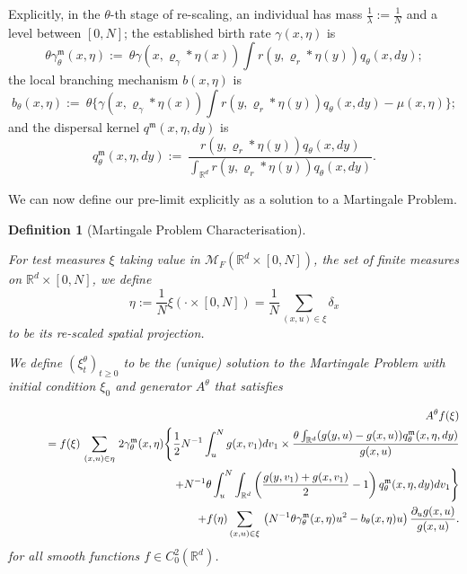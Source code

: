 \documentclass[12pt]{article}
\newtheorem{definition}[theorem]{Definition}
\def \non{{\nonumber}}
\begin{document}
Explicitly, in the $\theta$-th stage of re-scaling,
an individual has mass $\frac{1}{\lambda} := \frac{1}{N}$
and a level between $[0,N]$;
the established birth rate $\gamma(x,\eta)$ is
$$\theta\gamma^{\mathfrak{m}}_{\theta}(x, \eta)
:=~\theta\gamma(x, \varrho_{\gamma}*\eta(x)) \int r(y, \varrho_{r}*\eta(y))q_{\theta}(x,dy);$$
the local branching mechanism $b(x,\eta)$ is 
$$b_{\theta}(x, \eta):=~ \theta \bigg\{ \gamma(x, \varrho_{\gamma}*\eta(x)) \int r(y, \varrho_{r}*\eta(y))q_{\theta}(x,dy)-\mu(x, \eta)\bigg\};$$
and the dispersal kernel $q^{\mathfrak{m}}(x,\eta, dy)$ is 
$$q^{\mathfrak{m}}_{\theta}(x,\eta,dy) 
:=~ \frac{r(y,\varrho_{r}*\eta(y)) q_{\theta}(x,dy)}{\int_{\mathbb{R}^d} r(y,\varrho_{r}*\eta(y)) q_{\theta}(x,dy)}.$$

We can now define our pre-limit explicitly as a solution to a Martingale Problem.
\begin{definition}[Martingale Problem Characterisation]
\label{Def: Rescaled Lookdown Models}

For test measures $\xi$ taking value in $\mathcal{M}_F(\mathbb{R}^d \times [0,N])$,
the set of finite measures on $\mathbb{R}^d \times [0,N]$,
we define
$$\eta:= \frac{1}{N}\xi(\cdot  \times [0, N])=
\frac{1}{N}\sum_{(x,u) \in \xi}\delta_x$$
to be its re-scaled spatial projection.

We define $(\xi^{\theta}_t)_{t \geq 0}$
to be the (unique) solution
to the Martingale Problem
with initial condition $\xi_0$
and generator $A^{\theta}$ that satisfies

\begin{eqnarray}\label{Eq: Prelimit Lookdown Generator}
&&A^{\theta}f(\xi ) \\
&&\quad =f(\xi )\,\sum_{(x,u)\in\eta}\,2 \gamma^{\mathfrak{m}}_{\theta}(x, \eta)\Bigg\{ \frac 12 N^{-1}\int_u^{
N}g(x,v_1)dv_1\times \frac { \theta\int_{\mathbb{R}^d}(g(y,u)-g(x,u))q^{\mathfrak{m}}_{\theta}(x,\eta,dy) }{g(x,u)}\non\\
&&\qquad\qquad\qquad\qquad\qquad\qquad\qquad +N^{-1}\theta\int_u^{
N}\int_{\mathbb{R}^d}\left(\frac{g(y,v_1)+g(x,v_1)}{2}-1\right)q^{\mathfrak{m}}_{\theta}(x,\eta,dy)dv_1\nonumber\Bigg\}\\
&&\qquad\qquad
+f(\eta )\sum_{(x,u)\in\xi}\,\left(N^{-1} \theta \gamma^{\mathfrak{m}}_{\theta}(x,\eta) u^2 -b_{\theta}(x,\eta)u\right)\frac {\partial_u g(x,u)}{g(x,u)}.\nonumber
\end{eqnarray}
for all smooth functions $f \in C^{2}_{0}(\mathbb{R}^d)$. 
\end{definition}
\end{document}
